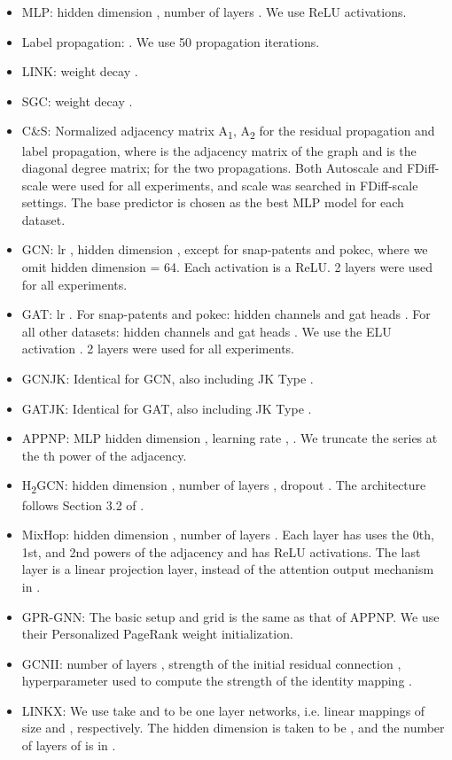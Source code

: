 \documentclass{article}
\begin{document}
\begin{itemize}
    \item MLP: hidden dimension , number of layers . We use ReLU activations.
    \item Label propagation: . We use 50 propagation iterations.
    \item LINK: weight decay .
    \item SGC: weight decay .
    \item C\&S: Normalized adjacency matrix A\textsubscript{1}, A\textsubscript{2}  for the residual propagation and label propagation, where  is the adjacency matrix of the graph and  is the diagonal degree matrix;  for the two propagations. Both Autoscale and FDiff-scale were used for all experiments, and scale  was searched in FDiff-scale settings. The base predictor is chosen as the best MLP model for each dataset.
    \item GCN: lr , hidden dimension , except for snap-patents and pokec, where we omit hidden dimension = 64. Each activation is a ReLU. 2 layers were used for all experiments.
    \item GAT: lr . For snap-patents and pokec: hidden channels  and gat heads . For all other datasets: hidden channels  and gat heads . We use the ELU activation \cite{clevert2015fast}. 2 layers were used for all experiments. 
    \item GCNJK: Identical for GCN, also including JK Type .
    \item GATJK: Identical for GAT, also including JK Type . 
    \item APPNP: MLP hidden dimension , learning rate , .  We truncate the series at the th power of the adjacency.
    \item H\textsubscript{2}GCN: hidden dimension , number of layers , dropout . The architecture follows Section 3.2 of \cite{zhu2020beyond}.
    \item MixHop: hidden dimension , number of layers . Each layer has uses the 0th, 1st, and 2nd powers of the adjacency and has ReLU activations. The last layer is a linear projection layer, instead of the attention output mechanism in \cite{abu2019mixhop}.
    \item GPR-GNN: The basic setup and grid is the same as that of APPNP. We use their Personalized PageRank weight initialization.
    \item GCNII: number of layers , strength of the initial residual connection , hyperparameter used to compute the strength of the identity mapping .
    \item LINKX: We use take  and  to be one layer networks, i.e. linear mappings of size  and , respectively. The hidden dimension is taken to be , and the number of layers of  is in . 
\end{itemize}
\end{document}
